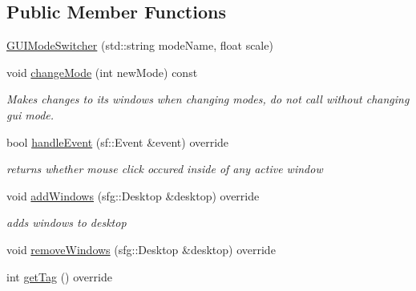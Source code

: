 \subsection*{Public Member Functions}
\begin{DoxyCompactItemize}
\item 
\hyperlink{classGUIModeSwitcher_aac580eabe162e7f8a8ba88ad3b2e3ebc}{G\-U\-I\-Mode\-Switcher} (std\-::string mode\-Name, float scale)
\item 
\hypertarget{classGUIModeSwitcher_a26547002840d8da94a1bf2e2254c8ed1}{void \hyperlink{classGUIModeSwitcher_a26547002840d8da94a1bf2e2254c8ed1}{change\-Mode} (int new\-Mode) const }\label{classGUIModeSwitcher_a26547002840d8da94a1bf2e2254c8ed1}

\begin{DoxyCompactList}\small\item\em Makes changes to its windows when changing modes, do not call without changing gui mode. \end{DoxyCompactList}\item 
\hypertarget{classGUIModeSwitcher_aeb0fb8ccf08088ddb6a32fbfc20459e5}{bool \hyperlink{classGUIModeSwitcher_aeb0fb8ccf08088ddb6a32fbfc20459e5}{handle\-Event} (sf\-::\-Event \&event) override}\label{classGUIModeSwitcher_aeb0fb8ccf08088ddb6a32fbfc20459e5}

\begin{DoxyCompactList}\small\item\em returns whether mouse click occured inside of any active window \end{DoxyCompactList}\item 
\hypertarget{classGUIModeSwitcher_ab0bf3051862cf606baf6ac0f45f4aa0d}{void \hyperlink{classGUIModeSwitcher_ab0bf3051862cf606baf6ac0f45f4aa0d}{add\-Windows} (sfg\-::\-Desktop \&desktop) override}\label{classGUIModeSwitcher_ab0bf3051862cf606baf6ac0f45f4aa0d}

\begin{DoxyCompactList}\small\item\em adds windows to desktop \end{DoxyCompactList}\item 
void \hyperlink{classGUIModeSwitcher_a68909a312720fa4eaaa4fa99ce0e5d64}{remove\-Windows} (sfg\-::\-Desktop \&desktop) override
\item 
\hypertarget{classGUIModeSwitcher_a23caeac2d6450aeb7e4d4c418394cf01}{int \hyperlink{classGUIModeSwitcher_a23caeac2d6450aeb7e4d4c418394cf01}{get\-Tag} () override}\label{classGUIModeSwitcher_a23caeac2d6450aeb7e4d4c418394cf01}


\end{DoxyCompactItemize}
